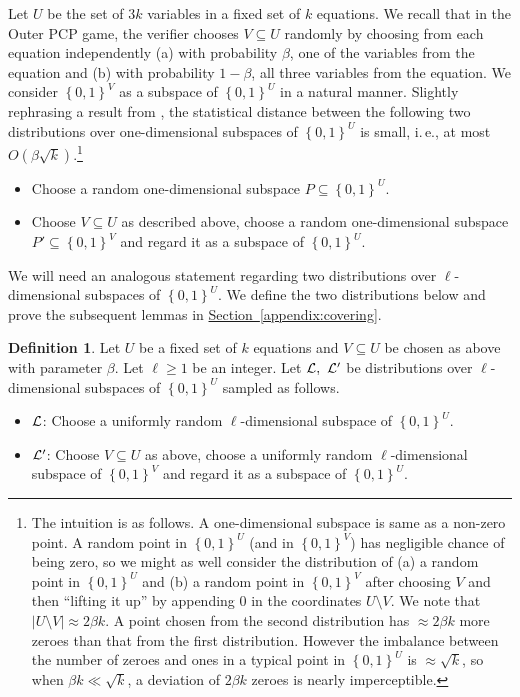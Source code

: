\documentclass[11pt]{article}
\numberwithin{equation}{section}
\theoremstyle{definition}
\newtheorem{definition}[theorem]{Definition}
\theoremstyle{plain}
\newcommand{\ie}{i.\,e.}
\newcommand{\expref}[2]{\hyperref[#2]{#1~\ref{#2}}}
\newcommand\set[1]{{\left\{ #1 \right\}}}
\newcommand\power[1]{\set{0,1}^{#1}}
\renewcommand\geq{\geqslant}
\begin{document}
\smallskip
Let $U$ be the set of $3k$ variables in a fixed set of $k$ equations.
We recall that in the Outer PCP game, the verifier chooses
$V\subseteq U$ randomly by choosing from each equation independently
(a) with probability $\beta$, one of the variables from the equation and
(b) with probability $1-\beta$, all three  variables from the equation.
We consider $\power{V}$ as a subspace of $\power{U}$ in a natural manner.
Slightly rephrasing a result from \cite{KS}, the statistical distance
between the following two distributions over one-dimensional subspaces of $\power{U}$ is small, \ie, at most $O(\beta \sqrt{k})$.\footnote{The intuition is as follows.
 A one-dimensional subspace is same as a non-zero point. A random point in $\power{U}$ (and in $\power{V}$) has negligible chance of being zero, so we
 might as well consider the distribution of (a) a random point in $\power{U}$ and (b) a random point in $\power{V}$ after choosing $V$ and then ``lifting it up''
 by appending $0$ in the coordinates $U \setminus V$. We note that $|U\setminus V| \approx 2\beta k$.
 A point chosen from the second distribution has  $\approx 2\beta k$ more zeroes
than that from the first distribution. However the imbalance between the number of zeroes and ones in a typical point in
$\power{U}$ is $\approx \sqrt{k}$, so when  $\beta k  \ll \sqrt{k}$, a deviation of $2\beta k$ zeroes is nearly imperceptible.}
\begin{itemize}
\item Choose a random one-dimensional subspace $P \subseteq \power{U}$.
\item Choose $V \subseteq U$ as described above, choose a random one-dimensional subspace $P' \subseteq \power{V}$ and regard it as a
      subspace of $\power{U}$.
\end{itemize}
We will need an analogous statement regarding two distributions over $\ell$-dimensional subspaces of $\power{U}$. We define the two distributions
below and prove the subsequent lemmas in \expref{Section}{appendix:covering}.
\begin{definition}\label{def:covering_dist} Let $U$ be a fixed set of $k$ equations and $V \subseteq U$ be chosen as above with
parameter $\beta$. Let $\ell \geq 1$ be an integer. Let ${\cal L}, ~{\cal L}'$ be distributions over $\ell$-dimensional subspaces of $\power{U}$ sampled as follows.
\begin{itemize}
\item ${\cal L}$: Choose  a uniformly random $\ell$-dimensional subspace of $\power{U}$.
\item ${\cal L'}$: Choose $V \subseteq U$ as above,  choose  a uniformly random $\ell$-dimensional subspace of $\power{V}$ and regard it as a
      subspace of $\power{U}$.
\end{itemize}
\end{definition}
\end{document}
